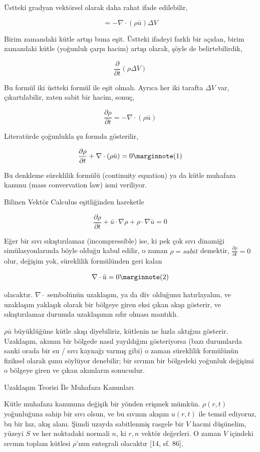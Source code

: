 \documentclass[12pt,fleqn]{article}\usepackage{../../common}
\begin{document}
Üstteki gradyan vektörsel olarak daha rahat ifade edilebilir,

$$
= -\nabla \cdot (\rho \bar{u} ) \Delta V
$$

Birim zamandaki kütle artışı buna eşit. Üstteki ifadeyi farklı bir açıdan, birim
zamandaki kütle (yoğunluk çarpı hacim) artışı olarak, şöyle de belirtebilirdik,

$$
\frac{\partial }{\partial t} (\rho \Delta V) 
$$

Bu formül iki üstteki formül ile eşit olmalı. Ayrıca her iki tarafta $\Delta V$
var, çıkartılabilir, zaten sabit bir hacim, sonuç,

$$
\frac{\partial \rho}{\partial t}  = -\nabla \cdot (\rho \bar{u} )
$$

Literatürde çoğunlukla şu formda gösterilir,

$$
\frac{\partial \rho}{\partial t}  + \nabla \cdot (\rho \bar{u} ) = 0
\mlabel{1}
$$

Bu denkleme süreklilik formülü (continuity equation) ya da kütle muhafaza kanunu
(mass convervation law) ismi veriliyor.

Bilinen Vektör Calculus eşitliğinden hareketle

$$
\frac{\partial \rho}{\partial t}  +
\bar{u} \cdot \nabla \rho +
\rho \cdot \nabla \bar{u} = 0
$$

Eğer bir sıvı sıkıştırılamaz (incompressible) ise, ki pek çok sıvı dinamiği
simülasyonlarında böyle olduğu kabul edilir, o zaman $\rho = sabit$ demektir,
$\frac{\partial \rho}{\partial t} = 0 $ olur, değişim yok, süreklilik
formülünden geri kalan

$$
\nabla \cdot \bar{u} = 0
\mlabel{2}
$$

olacaktır. $\nabla \cdot$ sembolünün uzaklaşım, ya da $\operatorname{div}$ olduğunu
hatırlayalım, ve uzaklaşım yaklaşık olarak bir bölgeye giren eksi çıkan akışı
gösterir, ve sıkıştırılamaz durumda uzaklaşımın sıfır olması mantıklı.

$\rho \bar{u}$ büyüklüğüne kütle akışı diyebiliriz, kütlenin ne hızla aktığını
gösterir. Uzaklaşım, akımın bir bölgede nasıl yayıldığını gösteriyorsa (bazı
durumlarda sanki orada bir su / sıvı kaynağı varmış gibi) o zaman süreklilik
formülünün fiziksel olarak şunu söylüyor denebilir; bir sıvının bir bölgedeki
yoğunluk değişimi o bölgeye giren ve çıkan akımların sonucudur.

Uzaklaşım Teorisi İle Muhafaza Kanunları

Kütle muhafaza kanununa değişik bir yönden erişmek mümkün. $\rho(r, t)$
yoğunluğuna sahip bir sıvı olsun, ve bu sıvının akışını $u(r, t)$ ile temsil
ediyoruz, bu bir hız, akış alanı. Şimdi uzayda sabitlenmiş rasgele bir $V$ hacmi
düşünelim, yüzeyi $S$ ve her noktadaki normali $n$, ki $r,n$ vektör değerleri. O
zaman $V$ içindeki sıvının toplam kütlesi $\rho$'nun entegrali olacaktır [14, sf. 86],
\end{document}
